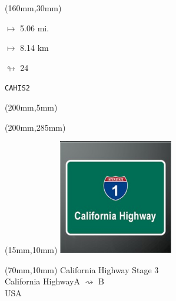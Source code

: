 \begin{textblock*}{40mm}(160mm,30mm)%
\Large
\par$\mapsto$ 5.06 mi.
\par$\mapsto$ 8.14 km
\par$\looparrowright$ 24
\par\hfill\tiny\tt CAHIS2\\
\end{textblock*}
\begin{textblock*}{20mm}(200mm,5mm)%
\fbox{\thepage}
\label{CAHIS2}
\end{textblock*}
\begin{textblock*}{20mm}(200mm,285mm)%
\fbox{\thepage}
\end{textblock*}

\null\newpage
\begin{textblock*}{50mm}(15mm,10mm)%
\includegraphics[width=50mm]{LG/2015-05-20_00077.png}
\end{textblock*}
\begin{textblock*}{130mm}(70mm,10mm)%
{\fontsize{20}{20}\selectfont California Highway Stage 3\\}
{\fontsize{16}{16}\selectfont California Highway\hfill A $\rightsquigarrow$ B\\}
{\fontsize{12}{12}\selectfont USA\\}
\end{textblock*}

